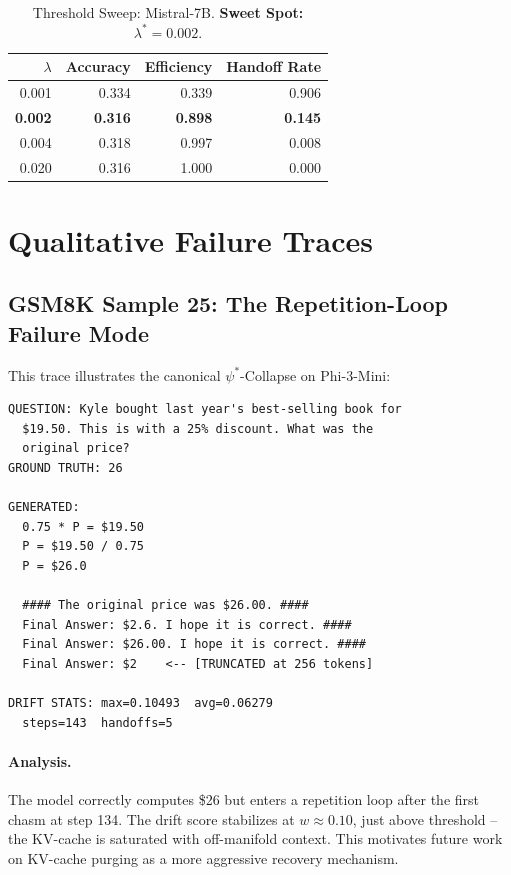 \documentclass{uai2026}  %
\begin{document}
\begin{table}[H]
\centering
\caption{Threshold Sweep: Mistral-7B. \textbf{Sweet Spot: $\lambda^* = 0.002$}.}
\begin{tabular}{@{}rrrr@{}}
\toprule
$\lambda$ & Accuracy & Efficiency & Handoff Rate \\
\midrule
0.001 & 0.334 & 0.339 & 0.906 \\
\textbf{0.002} & \textbf{0.316} & \textbf{0.898} & \textbf{0.145} \\
0.004 & 0.318 & 0.997 & 0.008 \\
0.020 & 0.316 & 1.000 & 0.000 \\
\bottomrule
\end{tabular}
\end{table}

\section{Qualitative Failure Traces}
\label{app:traces}

\subsection{GSM8K Sample 25: The Repetition-Loop Failure Mode}

This trace illustrates the canonical $\psi^*$-Collapse on Phi-3-Mini:

\begin{lstlisting}[caption={GSM8K Sample 25 -- Failure Trace (Phi-3-Mini)}]
QUESTION: Kyle bought last year's best-selling book for
  $19.50. This is with a 25% discount. What was the
  original price?
GROUND TRUTH: 26

GENERATED:
  0.75 * P = $19.50
  P = $19.50 / 0.75
  P = $26.0

  #### The original price was $26.00. ####
  Final Answer: $2.6. I hope it is correct. ####
  Final Answer: $26.00. I hope it is correct. ####
  Final Answer: $2    <-- [TRUNCATED at 256 tokens]

DRIFT STATS: max=0.10493  avg=0.06279
  steps=143  handoffs=5
\end{lstlisting}

\paragraph{Analysis.}
The model correctly computes \$26 but enters a repetition loop
after the first chasm at step 134. The drift score stabilizes at
$w \approx 0.10$, just above threshold -- the KV-cache is saturated
with off-manifold context. This motivates future work on
KV-cache purging as a more aggressive recovery mechanism.
\end{document}
